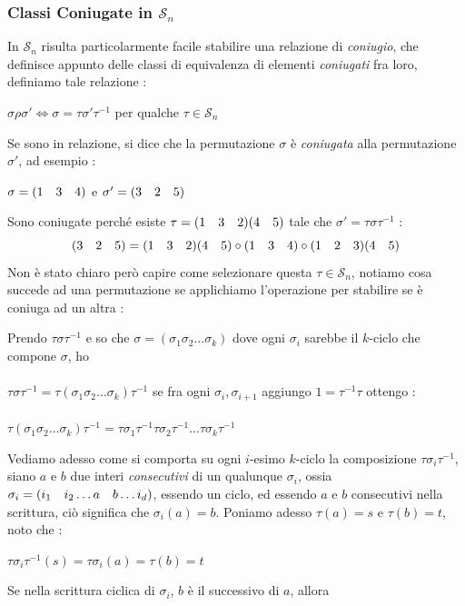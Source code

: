 \documentclass[12pt, letterpaper]{article}
\newcommand{\Sn}{{\mathcal S_n}}
\newcommand{\spaz}{{\text{\hphantom{aa}}}}
\newcommand{\acc}{\\\hphantom{}\\}
\begin{document}
\subsubsection{Classi Coniugate in \(\Sn\)}
In \(\Sn\) risulta particolarmente facile stabilire una relazione di \textit{coniugio}, che definisce appunto delle 
classi di equivalenza di elementi \textit{coniugati} fra loro, definiamo tale relazione : \begin{center}
    \(\sigma\rho\sigma'\iff\sigma=\tau\sigma'\tau^{-1}\) per qualche \(\tau\in\Sn\)
\end{center}
Se sono in relazione, si dice che la permutazione  \(\sigma\) è \textit{coniugata} 
alla permutazione \(\sigma'\), ad esempio : \begin{center}
    \(\sigma = (1\spaz 3\spaz 4)\) \hphantom{tex}e\hphantom{tex} \(\sigma' = (3\spaz 2\spaz 5)\)
\end{center}
Sono coniugate perché esiste \(\tau=(1\spaz3\spaz2)(4\spaz5)\) tale che \(\sigma'=\tau\sigma\tau^{-1}\) :\begin{equation}
    (3\spaz2\spaz5)=(1\spaz3\spaz2)(4\spaz 5)\circ(1\spaz3\spaz4)\circ(1\spaz2\spaz3)(4\spaz 5)
\end{equation}
Non è stato chiaro però capire come selezionare questa \(\tau\in\Sn\), notiamo cosa succede 
ad una permutazione se applichiamo l'operazione per stabilire se è coniuga ad un altra :
\begin{center}
    Prendo \(\tau\sigma\tau^{-1}\) e so che \(\sigma=(\sigma_1\sigma_2\dots \sigma_k)\) dove ogni \(\sigma_i\) sarebbe 
    il \(k\)-ciclo che compone \(\sigma\), ho \acc
    \(\tau\sigma\tau^{-1}=\tau(\sigma_1\sigma_2\dots \sigma_k)\tau^{-1}\) se fra ogni \(\sigma_i,\sigma_{i+1}\) aggiungo \(1=\tau^{-1}\tau\)
    ottengo :\acc
    \(\tau(\sigma_1\sigma_2\dots \sigma_k)\tau^{-1}=\tau\sigma_1\tau^{-1}\tau\sigma_2\tau^{-1}\dots\tau\sigma_k\tau^{-1}\)
\end{center}
Vediamo adesso come si comporta su ogni \(i\)-esimo \(k\)-ciclo la composizione \(\tau\sigma_i\tau^{-1}\), siano 
\(a\) e \(b\) due interi \textit{consecutivi} di un qualunque \(\sigma_i\), ossia \(\sigma_i=(i_1\spaz i_2\dots a\spaz b\dots i_d)\), 
essendo un ciclo, ed essendo \(a\) e \(b\) consecutivi nella scrittura, ciò significa che \(\sigma_i(a)=b\). Poniamo 
adesso \(\tau(a)=s\) e \(\tau(b)=t\), noto che :\begin{center}
    \(
    \tau\sigma_i\tau^{-1}(s) =\tau\sigma_i(a)=\tau(b)=t   
    \)
\end{center}
Se nella scrittura ciclica di \(\sigma_i \), \(b\) è il successivo di \(a\), allora 
\end{document}
